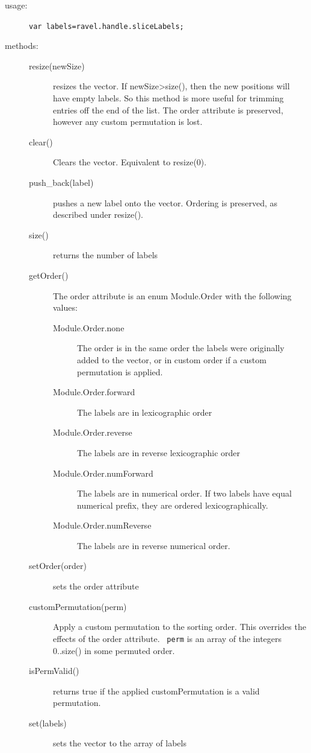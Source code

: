 \documentclass{article}
\begin{document}
\begin{description}
\item[usage:] \verb+var labels=ravel.handle.sliceLabels;+
  
\item[methods:]\mbox{}
\begin{description}
\item[resize(newSize)] resizes the vector. If newSize>size(), then the
  new positions will have empty labels. So this method is more useful
  for trimming entries off the end of the list. The order attribute is
  preserved, however any custom permutation is lost.
\item[clear()] Clears the vector. Equivalent to resize(0).
\item[push\_back(label)] pushes a new label onto the vector. Ordering
  is preserved, as described under resize().
\item[size()] returns the number of labels
  
\item[getOrder()] The order attribute is an enum Module.Order with the
  following values:
\begin{description}
\item[Module.Order.none] The order is in the same order the labels
  were originally added to the vector, or in custom order if a custom
  permutation is applied.
\item[Module.Order.forward] The labels are in lexicographic order
\item[Module.Order.reverse] The labels are in reverse lexicographic order
\item[Module.Order.numForward] The labels are in numerical order. If two labels
  have equal numerical prefix, they are ordered lexicographically.
\item[Module.Order.numReverse] The labels are in reverse numerical
order.
\end{description}
\item[setOrder(order)] sets the order attribute
  
\item[customPermutation(perm)] Apply a custom permutation to the
  sorting order. This overrides the effects of the order attribute. {\tt
    perm} is an array of the integers 0..size() in some permuted order.
\item[isPermValid()] returns true if the applied customPermutation is
  a valid permutation.
\item[set(labels)] sets the vector to the array of labels
\end{description} 
\end{description} 
\end{document}
